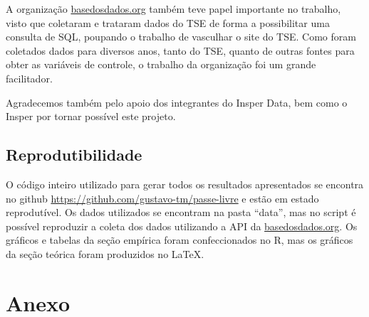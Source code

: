 A organização \url{basedosdados.org} também teve papel importante no trabalho, visto que coletaram e trataram dados do TSE de forma a possibilitar uma consulta de SQL, poupando o trabalho de vasculhar o site do TSE. Como foram coletados dados para diversos anos, tanto do TSE, quanto de outras fontes para obter as variáveis de controle, o trabalho da organização foi um grande facilitador. 

Agradecemos também pelo apoio dos integrantes do Insper Data, bem como o Insper por tornar possível este projeto.

\subsection{Reprodutibilidade}

O código inteiro utilizado para gerar todos os resultados apresentados se encontra no github \url{https://github.com/gustavo-tm/passe-livre} e estão em estado reprodutível. Os dados utilizados se encontram na pasta ``data'', mas no script é possível reproduzir a coleta dos dados utilizando a API da \url{basedosdados.org}. Os gráficos e tabelas da seção empírica foram confeccionados no R, mas os gráficos da seção teórica foram produzidos no \LaTeX . 

\printbibliography[keyword = passeLivre]

\clearpage
\section{Anexo}
\label{sec_anex}



